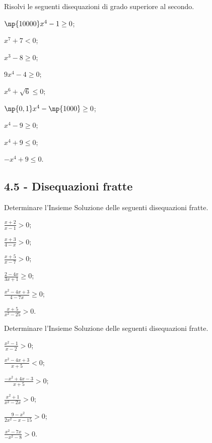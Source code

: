 \begin{esercizio}
 \label{ese:4.57}
Risolvi le seguenti disequazioni di grado superiore al secondo.
\begin{multicols}{3}
\begin{enumeratea}
\item $\np{10000}x^4-1\ge 0$;
\item $x^7+7<0$;
\item $x^3-8\ge 0$;
\item $9x^4-4\ge 0$;
\item $x^6+\sqrt 6\le 0$;
\item $\np{0,1}x^4-\np{1000}\ge 0$;
\item $x^4-9\ge 0$;
\item $x^4+9\le 0$;
\item $-x^4+9\le 0$.
\end{enumeratea}
\end{multicols}
\end{esercizio}

\subsection*{4.5 - Disequazioni fratte}

\begin{esercizio}[\Ast]
 \label{ese:4.58}
Determinare l'Insieme Soluzione delle seguenti disequazioni fratte.
\begin{multicols}{3}
\begin{enumeratea}
\item $\frac{x+2}{x-1}>0$;
\item $\frac{x+3}{4-x}>0$;
\item $\frac{x+5}{x-7}>0$;
\item $\frac{2-4x}{3x+1}\ge 0$;
\item $\frac{x^2-4x+3}{4-7x}\ge 0$;
\item $\frac{x+5}{x^2-25}>0$.
\end{enumeratea}
\end{multicols}
\end{esercizio}

\begin{esercizio}[\Ast]
 \label{ese:4.59}
Determinare l'Insieme Soluzione delle seguenti disequazioni fratte.
\begin{multicols}{3}
\begin{enumeratea}
\item $\frac{x^2-1}{x-2}>0$;
\item $\frac{x^2-4x+3}{x+5}<0$;
\item $\frac{-x^2+4x-3}{x+5}>0$;
\item $\frac{x^2+1}{x^2-2x}>0$;
\item $\frac{9-x^2}{2x^2-x-15}>0$;
\item $\frac{x^2-7x}{-x^2-8}>0$.
\end{enumeratea}
\end{multicols}
\end{esercizio}

